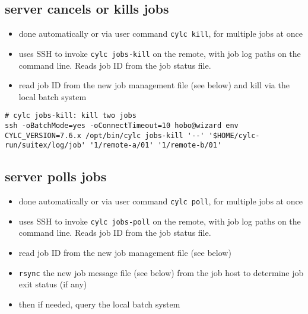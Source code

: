 \documentclass{article}
\begin{document}
\subsection{server cancels or kills jobs}

\begin{itemize}
  \item done automatically or via user command \lstinline=cylc kill=, for
    multiple jobs at once
  \item uses SSH to invoke \lstinline=cylc jobs-kill= on the
    remote, with job log paths on the command line. Reads job ID from the
    job status file.
\end{itemize}

{\color{blue}{\bf SSH-free?}
\begin{itemize}
  \item read job ID from the new job management file (see below) and kill via
    the local batch system
\end{itemize}
}

\vspace{5mm}
    \begin{lstlisting}
# cylc jobs-kill: kill two jobs
ssh -oBatchMode=yes -oConnectTimeout=10 hobo@wizard env CYLC_VERSION=7.6.x /opt/bin/cylc jobs-kill '--' '$HOME/cylc-run/suitex/log/job' '1/remote-a/01' '1/remote-b/01'
    \end{lstlisting}

\subsection{server polls jobs}

\begin{itemize}
  \item done automatically or via user command \lstinline=cylc poll=, for
    multiple jobs at once
  \item uses SSH to invoke \lstinline=cylc jobs-poll= on the
    remote, with job log paths on the command line. Reads job ID from the
    job status file.
\end{itemize}

{\color{blue}{\bf SSH-free?}
\begin{itemize}
  \item read job ID from the new job management file (see below)
  \item \lstinline=rsync= the new job message file (see below) from the job
    host to determine job exit status (if any)
  \item then if needed, query the local batch system
\end{itemize}
}
\end{document}
